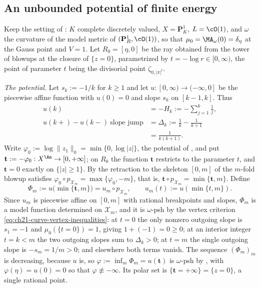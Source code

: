 \subsection{An unbounded potential of finite energy}
\label{sec:ch26-ex-unbounded}

\begin{example}
\label{ex:ch26-unbounded-finite-energy}
Keep the setting of : \(K\) complete discretely
valued, \(X=\mathbf P^1_K\), \(L=\cO(1)\), and \(\omega\) the curvature of
the model metric of \((\mathbf P^1_R,\cO(1))\), so that
\(\mu_0=\MA_\omega(0)=\delta_\eta\) at the Gauss point and \(V=1\).  Let
\(R_0=[\eta,0]\) be the ray obtained from the tower of blowups at the closure
of \(\{z=0\}\), parametrized by \(t=-\log r\in[0,\infty)\), the point of
parameter \(t\) being the divisorial point \(\zeta_{0,|\pi|^t}\).

\emph{The potential.}  Let \(s_k:=-1/k\) for \(k\geq1\) and let
\(u:[0,\infty)\to(-\infty,0]\) be the piecewise affine function with
\(u(0)=0\) and slope \(s_k\) on \([k-1,k]\).  Thus
\[
 \begin{aligned}
 u(k)&=-H_k:=-\sum_{j=1}^k\frac1j,\\
 u(k+)-u(k-)\ \text{slope jump}
   &=\Delta_k:=\frac1k-\frac1{k+1}\\
   &=\frac1{k(k+1)} .
 \end{aligned}
\]
Write \(\varphi_0:=\log\lVert z_1\rVert_0=\min\{0,\log|z|\}\), the potential
of , and put
\(\mathbf t:=-\varphi_0:X^{\An}\to[0,+\infty]\); on \(R_0\) the function
\(\mathbf t\) restricts to the parameter \(t\), and
\(\mathbf t=0\) exactly on \(\{|z|\geq1\}\).  By
 the retraction to the skeleton \([0,m]\) of the
\(m\)-fold blowup satisfies \(\varphi_0\circ p_{\mathcal X_m}
=\max\{\varphi_0,-m\}\), that is,
\(\mathbf t\circ p_{\mathcal X_m}=\min\{\mathbf t,m\}\).  Define
\[
 \Phi_m:=u\bigl(\min\{\mathbf t,m\}\bigr)
 =u_m\circ p_{\mathcal X_m},
 \qquad u_m(t):=u(\min\{t,m\}).
\]
Since \(u_m\) is piecewise affine on \([0,m]\) with rational breakpoints and
slopes, \(\Phi_m\) is a model function determined on \(\mathcal X_m\), and it
is \(\omega\)-psh by the vertex criterion
\eqref{eq:ch21-curve-vertex-inequalities}: at \(t=0\) the only nonzero
outgoing slope is \(s_1=-1\) and \(\mu_0(\{t=0\})=1\), giving
\(1+(-1)=0\geq0\); at an interior integer \(t=k<m\) the two outgoing slopes
sum to \(\Delta_k>0\); at \(t=m\) the single outgoing slope is
\(-s_m=1/m>0\); and elsewhere both terms vanish.  The sequence
\((\Phi_m)_m\) is decreasing, because \(u\) is, so
\(\varphi:=\inf_m\Phi_m=u(\mathbf t)\) is \(\omega\)-psh by
, with
\(\varphi(\eta)=u(0)=0\) so that \(\varphi\not\equiv-\infty\).  Its polar set
is \(\{\mathbf t=+\infty\}=\{z=0\}\), a single rational point.


\end{example}
